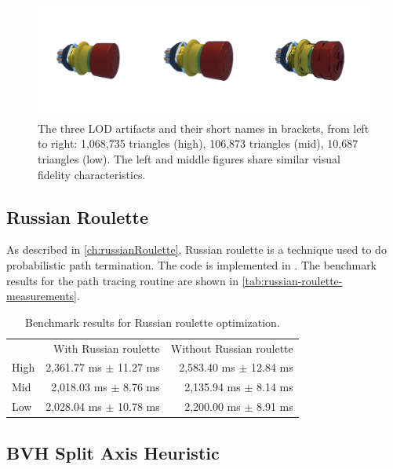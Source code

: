 \begin{figure}[H]
    \includegraphics[width=0.9\columnwidth]{resources/benchmark-models.png}
    \caption{The three \gls{LOD} artifacts and their short names in brackets, from left to right: 1,068,735 triangles (high), 106,873 triangles (mid), 10,687 triangles (low). The left and middle figures share similar visual fidelity characteristics.}
    \label{fig:benchmark-models}
\end{figure}

\subsection*{Russian Roulette}

As described in \autoref{ch:russianRoulette}, Russian roulette is a technique used to do probabilistic path termination. The code is implemented in . The benchmark results for the path tracing routine are shown in \autoref{tab:russian-roulette-measurements}.

\begin{table}[H]
    \centering
    \begin{tabular}{@{}lrr@{}}
    \toprule
    & With Russian roulette & Without Russian roulette \\
    High & 2,361.77 ms $\pm$ 11.27 ms & 2,583.40 ms $\pm$ 12.84 ms \\
    Mid & 2,018.03 ms $\pm$ 8.76 ms & 2,135.94 ms $\pm$ 8.14 ms \\
    Low & 2,028.04 ms $\pm$ 10.78 ms & 2,200.00 ms $\pm$ 8.91 ms \\
    \bottomrule
    \end{tabular}
    \caption{Benchmark results for Russian roulette optimization.}
    \label{tab:russian-roulette-measurements}
\end{table}

\subsection*{BVH Split Axis Heuristic}


